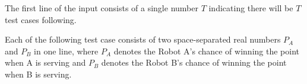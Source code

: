 The first line of the input consists of a single number $T$ indicating there 
will be $T$ test cases following.

Each of the following test case consists of two space-separated real numbers 
$P_A$ and $P_B$ in one line, where $P_A$ denotes the Robot A's chance of 
winning the point when A is serving and $P_B$ denotes the Robot B's chance of 
winning the point when B is serving.
